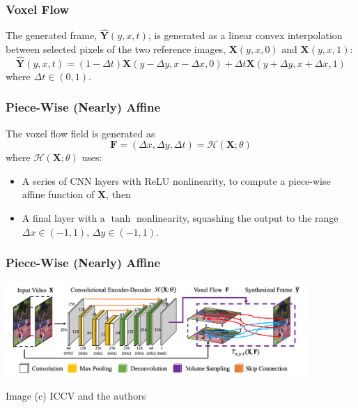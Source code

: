 \documentclass{beamer}
\begin{document}
\begin{frame}
  \frametitle{Voxel Flow}

  The generated frame, $\mathbf{\hat{Y}}(y,x,t)$, is generated as a
  linear convex interpolation between selected pixels of the two
  reference images, $\mathbf{X}(y,x,0)$ and $\mathbf{X}(y,x,1)$:
  \begin{displaymath}
    \mathbf{\hat{Y}}(y,x,t)=
    \left(1-\Delta t\right)\mathbf{X}\left(y-\Delta y,x-\Delta x,0\right)+
    \Delta t\mathbf{X}\left(y+\Delta y,x+\Delta x,1\right)
  \end{displaymath}
  where $\Delta t\in(0,1)$.
\end{frame}

\begin{frame}
  \frametitle{Piece-Wise (Nearly) Affine}

  The voxel flow field is generated as
  \begin{displaymath}
    \mathbf{F}=(\Delta x,\Delta y,\Delta t)={\mathcal H}\left(\mathbf{X};\theta\right)
  \end{displaymath}
  where ${\mathcal H}\left(\mathbf{X};\theta\right)$ uses:
  \begin{itemize}
  \item A series of CNN layers with ReLU nonlinearity, to compute a
    piece-wise affine function of $\mathbf{X}$, then
  \item A final layer with a $\tanh$ nonlinearity, squashing the output
    to the range $\Delta x\in\left(-1,1\right)$,
    $\Delta y\in\left(-1,1\right)$.
  \end{itemize}
\end{frame}

\begin{frame}
  \frametitle{Piece-Wise (Nearly) Affine}

  \centerline{\includegraphics[width=4.5in]{figs/liu17iccv1.png}}
  \begin{small}Image (c) ICCV and the authors\end{small}
\end{frame}
\end{document}

